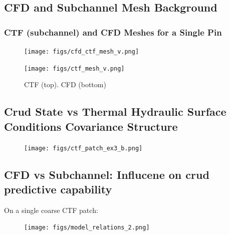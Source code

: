 \documentclass[t, pdftex]{beamer}
\begin{document}
\subsection*{CFD and Subchannel Mesh Background}
\begin{frame}
\frametitle{CTF (subchannel) and CFD Meshes for a Single Pin}
\vspace{-20pt}
\begin{figure}
        \centering
        \begin{minipage}{.4\textwidth}
            \centering
            \texttt{[image: figs/cfd\_ctf\_mesh\_v.png]}
            \caption{\centering \scriptsize CTF (top).  CFD (bottom) }
        \end{minipage}%
        \begin{minipage}{.4\textwidth}
            \centering
            \texttt{[image: figs/ctf\_mesh\_v.png]}
        \end{minipage}
\end{figure}
\cite{salko17}
\end{frame}

\subsection*{Crud State vs Thermal Hydraulic Surface Conditions Covariance Structure}
\begin{frame}
\begin{figure}[]
    \vspace{-16.5pt}
    \centering
    \texttt{[image: figs/ctf\_patch\_ex3\_b.png]}
    \label{model_overview}
\end{figure}
\end{frame}

\subsection*{CFD vs Subchannel:  Influcene on crud predictive capability}
\begin{frame}
On a single coarse CTF patch:
\vspace{-6.5pt}
\begin{figure}[!htbp]
    \centering
    \texttt{[image: figs/model\_relations\_2.png]}
    \label{model_overview}
\end{figure}
\end{frame}
\end{document}

